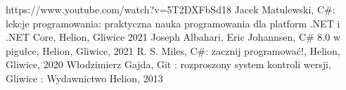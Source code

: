 \documentclass[polish,12pt,twoside,a4paper]{report}
\begin{document}




\newpage

\newpage

\newpage

\newpage

\newpage

\begin{thebibliography}{6}


 https://www.youtube.com/watch?v=5T2DXFbSd18 
\bibitem{} Jacek Matulewski, C\#: lekcje programowania: praktyczna nauka programowania dla platform .NET i .NET Core, Helion, Gliwice 2021 
\bibitem{} Joseph  Albahari, Eric Johannsen, C\# 8.0 w pigułce, Helion, Gliwice, 2021
\bibitem{} R. S. Miles, C\#: zacznij programować!, Helion, Gliwice, 2020
\bibitem{} Włodzimierz Gajda, Git : rozproszony system kontroli wersji, Gliwice : Wydawnictwo Helion, 2013

\end{thebibliography}
\newpage


\end{document}

